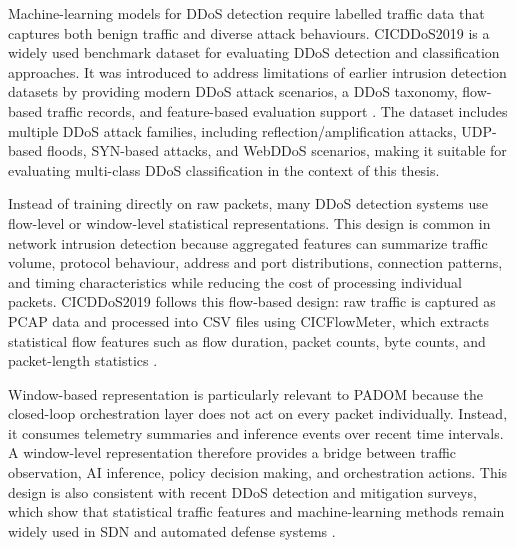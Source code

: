 \documentclass[12pt, a4paper, reqno, oneside]{book}
\newcommand{\padonap}{\textsc{PADOM}}
\begin{document}
Machine-learning models for DDoS detection require labelled traffic data that
captures both benign traffic and diverse attack behaviours. CICDDoS2019 is a
widely used benchmark dataset for evaluating DDoS detection and classification
approaches. It was introduced to address limitations of earlier intrusion
detection datasets by providing modern DDoS attack scenarios, a DDoS taxonomy,
flow-based traffic records, and feature-based evaluation support
\cite{sharafaldin2019cicddos,cicddos2019_official}. The dataset includes
multiple DDoS attack families, including reflection/amplification attacks,
UDP-based floods, SYN-based attacks, and WebDDoS scenarios, making it suitable
for evaluating multi-class DDoS classification in the context of this thesis.

Instead of training directly on raw packets, many DDoS detection systems use
flow-level or window-level statistical representations. This design is common
in network intrusion detection because aggregated features can summarize
traffic volume, protocol behaviour, address and port distributions, connection
patterns, and timing characteristics while reducing the cost of processing
individual packets. CICDDoS2019 follows this flow-based design: raw traffic is
captured as PCAP data and processed into CSV files using CICFlowMeter, which
extracts statistical flow features such as flow duration, packet counts, byte
counts, and packet-length statistics \cite{cicddos2019_official,cicflowmeter_official}.

Window-based representation is particularly relevant to \padonap{} because the
closed-loop orchestration layer does not act on every packet individually.
Instead, it consumes telemetry summaries and inference events over recent time
intervals. A window-level representation therefore provides a bridge between
traffic observation, AI inference, policy decision making, and orchestration
actions. This design is also consistent with recent DDoS detection and
mitigation surveys, which show that statistical traffic features and
machine-learning methods remain widely used in SDN and automated defense
systems \cite{hill2024ddos_sdn_survey,apostu2025ai_ddos_survey}.

\end{document}
